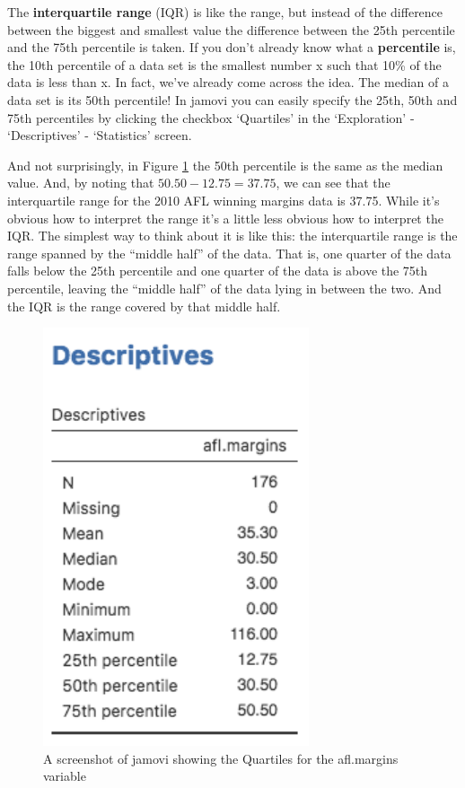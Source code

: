\documentclass[
]{book}
\begin{document}
The \textbf{interquartile range} (IQR) is like the range, but instead of the difference between the biggest and smallest value the difference between the 25th percentile and the 75th percentile is taken. If you don't already know what a \textbf{percentile} is, the 10th percentile of a data set is the smallest number x such that 10\% of the data is less than x. In fact, we've already come across the idea. The median of a data set is its 50th percentile! In jamovi you can easily specify the 25th, 50th and 75th percentiles by clicking the checkbox `Quartiles' in the `Exploration' - `Descriptives' - `Statistics' screen.

And not surprisingly, in Figure \ref{fig:fig4-8} the 50th percentile is the same as the median value. And, by noting that \(50.50 - 12.75 = 37.75\), we can see that the interquartile range for the 2010 AFL winning margins data is 37.75. While it's obvious how to interpret the range it's a little less obvious how to interpret the IQR. The simplest way to think about it is like this: the interquartile range is the range spanned by the ``middle half'' of the data. That is, one quarter of the data falls below the 25th percentile and one quarter of the data is above the 75th percentile, leaving the ``middle half'' of the data lying in between the two. And the IQR is the range covered by that middle half.

\begin{figure}
\includegraphics[width=0.5\linewidth]{images/Figure15} \caption{A screenshot of jamovi showing the Quartiles for the afl.margins variable}\label{fig:fig4-8}
\end{figure}
\end{document}
